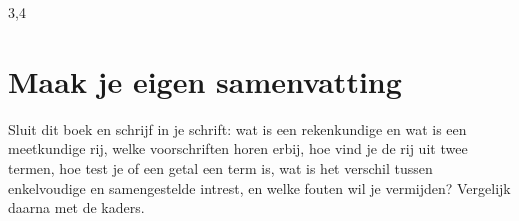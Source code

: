 \begin{oefeningen}


\begin{alleenvoor}{3,4}

\end{alleenvoor}


\end{oefeningen}


\begin{oefeningen}








\end{oefeningen}


\ifzelfstudie
\section*{Maak je eigen samenvatting}
Sluit dit boek en schrijf in je schrift: wat is een rekenkundige en wat is een meetkundige rij, welke voorschriften horen erbij, hoe vind je de rij uit twee termen, hoe test je of een getal een term is, wat is het verschil tussen enkelvoudige en samengestelde intrest, en welke fouten wil je vermijden? Vergelijk daarna met de kaders.
\fi
